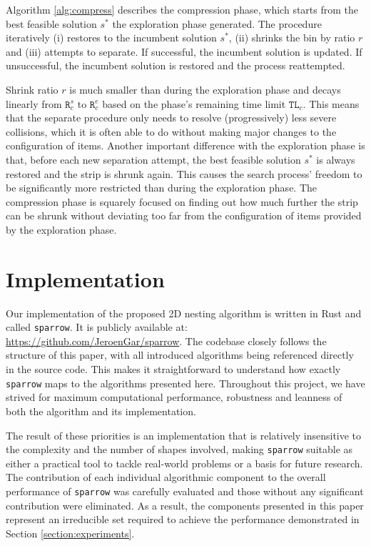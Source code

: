 \documentclass[preprint, 11pt, authoryear]{elsarticle}
\begin{document}


Algorithm \ref{alg:compress} describes the compression phase, which starts from the best feasible solution $s^*$ the exploration phase generated.
The procedure iteratively (i) restores to the incumbent solution $s^*$, (ii) shrinks the bin by ratio $r$ and (iii) attempts to separate.
If successful, the incumbent solution is updated.
If unsuccessful, the incumbent solution is restored and the process reattempted.

Shrink ratio $r$ is much smaller than during the exploration phase and decays linearly from $\texttt{R}_{c}^s$ to $\texttt{R}_{c}^e$ based on the phase's remaining time limit $\texttt{TL}_c$.
This means that the separate procedure only needs to resolve (progressively) less severe collisions, which it is often able to do without making major changes to the configuration of items.
Another important difference with the exploration phase is that, before each new separation attempt, the best feasible solution $s^*$ is always restored and the strip is shrunk again.
This causes the search process' freedom to be significantly more restricted than during the exploration phase.
The compression phase is squarely focused on finding out how much further the strip can be shrunk without deviating too far from the configuration of items provided by the exploration phase.

\section{Implementation} \label{section:implementation}
Our implementation of the proposed 2D nesting algorithm is written in Rust and called \texttt{sparrow}.
It is publicly available at: \url{https://github.com/JeroenGar/sparrow}.
The codebase closely follows the structure of this paper, with all introduced algorithms being referenced directly in the source code.
This makes it straightforward to understand how exactly \texttt{sparrow} maps to the algorithms presented here.
Throughout this project, we have strived for maximum computational performance, robustness and leanness of both the algorithm and its implementation.

The result of these priorities is an implementation that is relatively insensitive to the complexity and the number of shapes involved, making \texttt{sparrow} suitable as either a practical tool to tackle real-world problems or a basis for future research.
The contribution of each individual algorithmic component to the overall performance of \texttt{sparrow} was carefully evaluated and those without any significant contribution were eliminated.
As a result, the components presented in this paper represent an irreducible set required to achieve the performance demonstrated in Section \ref{section:experiments}.
\end{document}
